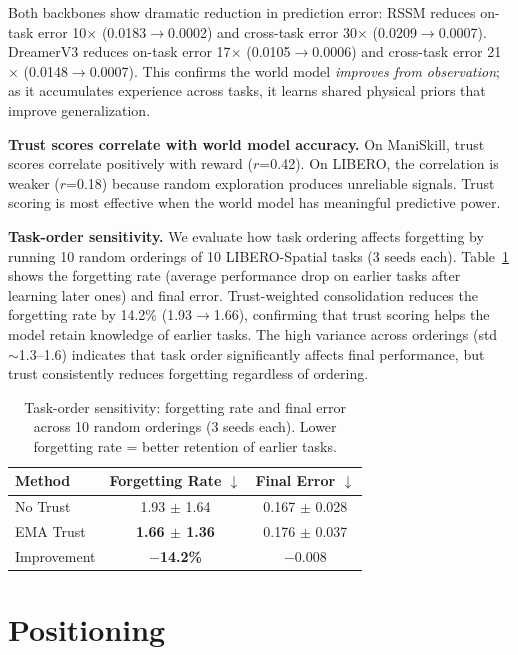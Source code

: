 \documentclass{article}
\begin{document}
Both backbones show dramatic reduction in prediction error: RSSM reduces on-task error 10$\times$ (0.0183$\to$0.0002) and cross-task error 30$\times$ (0.0209$\to$0.0007). DreamerV3 reduces on-task error 17$\times$ (0.0105$\to$0.0006) and cross-task error 21$\times$ (0.0148$\to$0.0007). This confirms the world model \emph{improves from observation}; as it accumulates experience across tasks, it learns shared physical priors that improve generalization.

\textbf{Trust scores correlate with world model accuracy.} On ManiSkill, trust scores correlate positively with reward ($r$=0.42). On LIBERO, the correlation is weaker ($r$=0.18) because random exploration produces unreliable signals. Trust scoring is most effective when the world model has meaningful predictive power.

\textbf{Task-order sensitivity.} We evaluate how task ordering affects forgetting by running 10 random orderings of 10 LIBERO-Spatial tasks (3 seeds each). Table~\ref{tab:task_order} shows the forgetting rate (average performance drop on earlier tasks after learning later ones) and final error. Trust-weighted consolidation reduces the forgetting rate by 14.2\% (1.93$\to$1.66), confirming that trust scoring helps the model retain knowledge of earlier tasks. The high variance across orderings (std $\sim$1.3--1.6) indicates that task order significantly affects final performance, but trust consistently reduces forgetting regardless of ordering.

\begin{table}[h]
\centering
\caption{Task-order sensitivity: forgetting rate and final error across 10 random orderings (3 seeds each). Lower forgetting rate = better retention of earlier tasks.}
\label{tab:task_order}
\small
\begin{tabular}{lcc}
\toprule
Method & Forgetting Rate $\downarrow$ & Final Error $\downarrow$ \\
\midrule
No Trust & 1.93 $\pm$ 1.64 & 0.167 $\pm$ 0.028 \\
EMA Trust & \textbf{1.66 $\pm$ 1.36} & 0.176 $\pm$ 0.037 \\
\midrule
Improvement & \textbf{$-$14.2\%} & $-$0.008 \\
\bottomrule
\end{tabular}
\end{table}

\section{Positioning}
\end{document}

